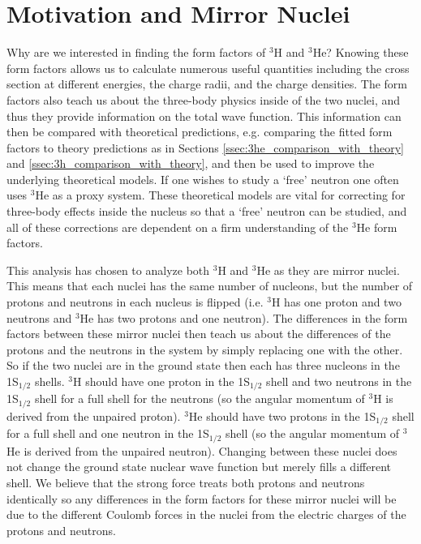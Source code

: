 \section{Motivation and Mirror Nuclei}
\label{sec:mirror_nuclei}

Why are we interested in finding the form factors of $^3$H and $^3$He? Knowing these form factors allows us to calculate numerous useful quantities including the cross section at different energies, the charge radii, and the charge densities. The form factors also teach us about the three-body physics inside of the two nuclei, and thus they provide information on the total wave function. This information can then be compared with theoretical predictions, e.g. comparing the fitted form factors to theory predictions as in Sections \ref{ssec:3he_comparison_with_theory} and \ref{ssec:3h_comparison_with_theory}, and then be used to improve the underlying theoretical models. If one wishes to study a `free' neutron one often uses $^3$He as a proxy system. These theoretical models are vital for correcting for three-body effects inside the nucleus so that a `free' neutron can be studied, and all of these corrections are dependent on a firm understanding of the $^3$He form factors.

This analysis has chosen to analyze both $^3$H and $^3$He as they are mirror nuclei. This means that each nuclei has the same number of nucleons, but the number of protons and neutrons in each nucleus is flipped (i.e. $^3$H has one proton and two neutrons and $^3$He has two protons and one neutron). The differences in the form factors between these mirror nuclei then teach us about the differences of the protons and the neutrons in the system by simply replacing one with the other. So if the two nuclei are in the ground state then each has three nucleons in the 1S$_{1/2}$ shells. $^3$H should have one proton in the 1S$_{1/2}$ shell and two neutrons in the 1S$_{1/2}$ shell for a full shell for the neutrons (so the angular momentum of $^3$H is derived from the unpaired proton). $^3$He should have two protons in the 1S$_{1/2}$ shell for a full shell and one neutron in the 1S$_{1/2}$ shell (so the angular momentum of $^3$He is derived from the unpaired neutron). Changing between these nuclei does not change the ground state nuclear wave function but merely fills a different shell. We believe that the strong force treats both protons and neutrons identically so any differences in the form factors for these mirror nuclei will be due to the different Coulomb forces in the nuclei from the electric charges of the protons and neutrons. 

